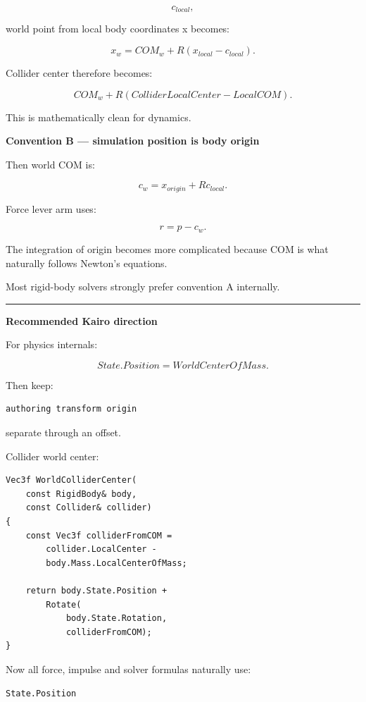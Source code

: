 \[
c_{local},
\]

world point from local body coordinates x becomes:

\[
x_w
=
COM_w
+
R(x_{local}-c_{local}).
\]

Collider center therefore becomes:

\[
COM_w
+
R(
ColliderLocalCenter-
LocalCOM).
\]

This is mathematically clean for dynamics.

\textbf{Convention B --- simulation position is body origin}

Then world COM is:

\[
\boxed{
c_w
=
x_{origin}
+
Rc_{local}.
}
\]

Force lever arm uses:

\[
r=
p-c_w.
\]

The integration of origin becomes more complicated because COM is what naturally follows Newton's equations.

Most rigid-body solvers strongly prefer convention A internally.

\begin{center}\rule{0.5\linewidth}{0.5pt}\end{center}

\textbf{Recommended Kairo direction}

For physics internals:

\[
\boxed{
State.Position
=
WorldCenterOfMass.
}
\]

Then keep:

\begin{verbatim}
authoring transform origin
\end{verbatim}

separate through an offset.

Collider world center:

\begin{verbatim}
Vec3f WorldColliderCenter(
    const RigidBody& body,
    const Collider& collider)
{
    const Vec3f colliderFromCOM =
        collider.LocalCenter -
        body.Mass.LocalCenterOfMass;

    return body.State.Position +
        Rotate(
            body.State.Rotation,
            colliderFromCOM);
}
\end{verbatim}

Now all force, impulse and solver formulas naturally use:

\begin{verbatim}
State.Position
\end{verbatim}

